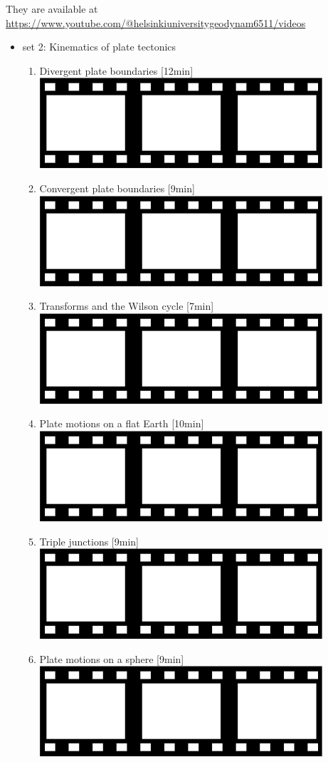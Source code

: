 They are available at \url{https://www.youtube.com/@helsinkiuniversitygeodynam6511/videos}
\begin{itemize}

\item set 2: Kinematics of plate tectonics
\begin{enumerate}
\item Divergent plate boundaries [12min] \href{https://youtu.be/x3OKt5Warr4?si=YJP5GuxXPTh6SLlo}{\includegraphics[width=.8cm]{images/pictograms/film.png}}
\item Convergent plate boundaries [9min] \href{https://youtu.be/8B4PC-75a1c?si=V5huZbOi1CAxGgxG}{\includegraphics[width=.8cm]{images/pictograms/film.png}}
\item Transforms and the Wilson cycle [7min] \href{https://youtu.be/cLsFLEcfPBY?si=t5St5urowPPwXLdq}{\includegraphics[width=.8cm]{images/pictograms/film.png}}
\item Plate motions on a flat Earth [10min] \href{https://youtu.be/lZMPACABF_E?si=9l1Z-OC9ZwMqn0tv}{\includegraphics[width=.8cm]{images/pictograms/film.png}}
\item Triple junctions [9min] \href{https://youtu.be/SG2X9t0J1fc?si=Qc8JMy3LzoDDzZpL}{\includegraphics[width=.8cm]{images/pictograms/film.png}}
\item Plate motions on a sphere [9min] \href{https://youtu.be/Fifg4O0fs2E?si=LB6NoWUioEEa9XZB}{\includegraphics[width=.8cm]{images/pictograms/film.png}}
\end{enumerate}


\end{itemize}
